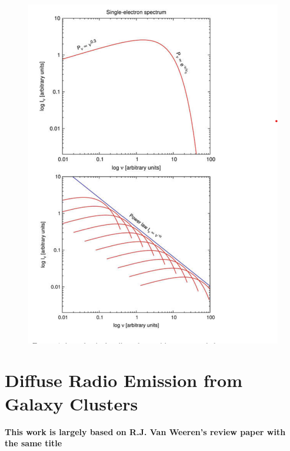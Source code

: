 \documentclass[12pt]{report}
\begin{document}
\begin{figure}\label{figsyn}
\includegraphics[scale=1]{figsyn.png}
\end{figure}
\chapter{Diffuse Radio Emission from Galaxy Clusters}
\textbf{This work is largely based on R.J.  Van Weeren's review paper with the same title}
\end{document}
